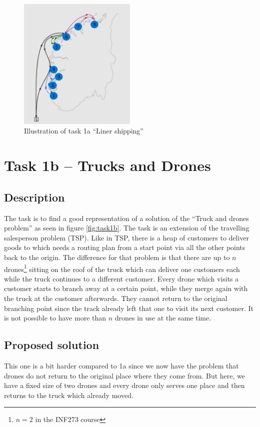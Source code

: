 \documentclass[a4paper,10pt]{article}
\theoremstyle{mytheor}
\begin{document}
\begin{figure}[h]
\centering
\includegraphics[width=0.5\textwidth]{task1a}
\caption{Illustration of task 1a \enquote{Liner shipping}}
\label{fig:task1a}
\end{figure}

\clearpage


\section*{Task 1b – Trucks and Drones}
\subsection*{Description}
The task is to find a good representation of a solution of the \enquote{Truck and drones problem} as seen in figure \ref{fig:task1b}. The task is an extension of the travelling salesperson problem (TSP). Like in TSP, there is a heap of customers to deliver goods to which needs a routing plan from a start point via all the other points back to the origin. The difference for that problem is that there are up to $n$ drones\footnote{$n=2$ in the INF273 course} sitting on the roof of the truck which can deliver one customers each while the truck continues to a different customer. Every drone which visits a customer starts to branch away at a certain point, while they merge again with the truck at the customer afterwards. They cannot return to the original branching point since the track already left that one to visit its next customer. It is not possible to have more than $n$ drones in use at the same time.\medskip

\subsection*{Proposed solution}
This one is a bit harder compared to 1a since we now have the problem that drones do not return to the original place where they come from. But here, we have a fixed size of two drones and every drone only serves one place and then returns to the truck which already moved.\\
\end{document}
